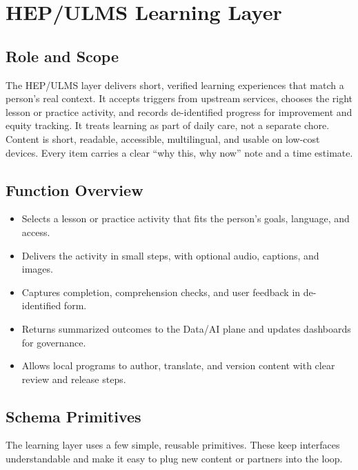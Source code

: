 \documentclass[12pt]{article}
\begin{document}

\section{HEP/ULMS Learning Layer}

\subsection*{Role and Scope}
The HEP/ULMS layer delivers short, verified learning experiences that match a person’s real context. It accepts triggers from upstream services, chooses the right lesson or practice activity, and records de-identified progress for improvement and equity tracking. It treats learning as part of daily care, not a separate chore. Content is short, readable, accessible, multilingual, and usable on low-cost devices. Every item carries a clear “why this, why now” note and a time estimate.

\subsection*{Function Overview}
\begin{itemize}[leftmargin=*]
  \item Selects a lesson or practice activity that fits the person’s goals, language, and access.
  \item Delivers the activity in small steps, with optional audio, captions, and images.
  \item Captures completion, comprehension checks, and user feedback in de-identified form.
  \item Returns summarized outcomes to the Data/AI plane and updates dashboards for governance.
  \item Allows local programs to author, translate, and version content with clear review and release steps.
\end{itemize}

\subsection*{Schema Primitives}
The learning layer uses a few simple, reusable primitives. These keep interfaces understandable and make it easy to plug new content or partners into the loop.
\end{document}
